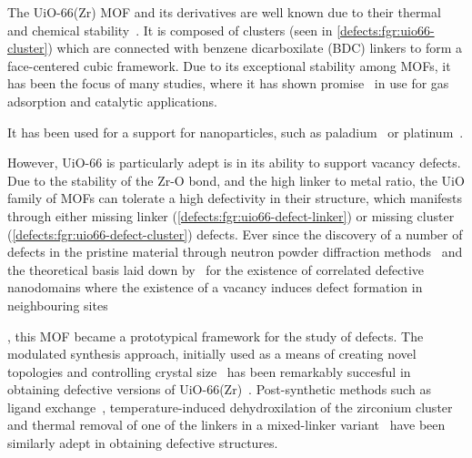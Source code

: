 The UiO-66(Zr) MOF and its derivatives are well known due to 
their thermal and chemical stability~\cite{cavkaNewZirconiumInorganic2008}. 
It is composed of  clusters 
(seen in \autoref{defects:fgr:uio66-cluster}) which are connected 
with benzene dicarboxilate (BDC) linkers to form a face-centered cubic
framework. Due to its exceptional stability among MOFs, it has been the
focus of many studies, where it has shown 
promise~\cite{wiersumEvaluationUiO66GasBased2011} in use for gas 
adsorption and catalytic applications.

It has been used for a support for nanoparticles, such
as paladium~\cite{shenHighlyDispersedPalladium2013}
or platinum~\cite{oienProbingReactivePlatinum2015}.

However, UiO-66 is particularly adept is in its ability to support
vacancy defects. Due to the stability of the Zr-O bond, and the 
high linker to metal ratio, the UiO family of MOFs can tolerate
a high defectivity in their structure, which manifests through 
either missing linker 
(\autoref{defects:fgr:uio66-defect-linker}) or missing 
cluster (\autoref{defects:fgr:uio66-defect-cluster}) defects. 
Ever since the discovery of a number of 
defects in the pristine material through neutron powder diffraction 
methods~\cite{wuUnusualHighlyTunable2013} and the theoretical
basis laid down by~\citeauthor{cliffeCorrelatedDefectNanoregions2014}
for the existence of correlated defective nanodomains where the
existence of a vacancy induces defect formation in neighbouring
sites~\author{cliffeCorrelatedDefectNanoregions2014}, this MOF
became a prototypical framework for the study of defects.
The modulated synthesis approach, initially used as 
a means of creating novel topologies and controlling crystal
size~\cite{guillermZirconiumMethacrylateOxocluster2010}
has been remarkably succesful in obtaining defective versions
of UiO-66(Zr)~\cite{shearerDefectEngineeringTuning2016}.
Post-synthetic methods such as ligand 
exchange~\cite{shearerFunctionalizingDefectsPostsynthetic2016},
temperature-induced dehydroxilation of the zirconium 
cluster~\cite{valenzanoDisclosingComplexStructure2011} and
thermal removal of one of the linkers in a mixed-linker
variant~\cite{buekenTacklingDefectConundrum2017} have been
similarly adept in obtaining defective structures.


